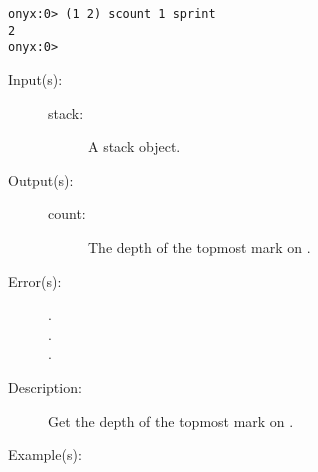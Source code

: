 \begin{description}
\begin{description}
\begin{verbatim}
onyx:0> (1 2) scount 1 sprint
2
onyx:0>
		\end{verbatim}
	\end{description}
\label{systemdict:scounttomark}
\item[{\onyxop{stack}{scounttomark}{count}}: ]
	\begin{description}\item[]
	\item[Input(s): ]
		\begin{description}\item[]
		\item[stack: ]
			A stack object.
		\end{description}
	\item[Output(s): ]
		\begin{description}\item[]
		\item[count: ]
			The depth of the topmost mark on .
		\end{description}
	\item[Error(s): ]
		\begin{description}\item[]
		\item[.]
		\item[.]
		\item[.]
		\end{description}
	\item[Description: ]
		Get the depth of the topmost mark on .
	\item[Example(s): ]\begin{verbatim}


\end{verbatim}
\end{description}
\end{description}
